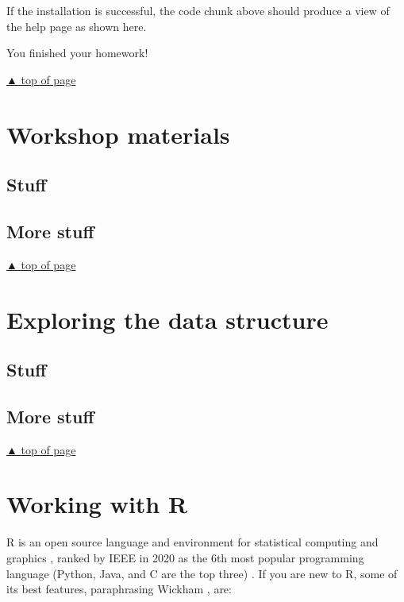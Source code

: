 \documentclass[
]{book}
\begin{document}
If the installation is successful, the code chunk above should produce a view of the help page as shown here.

You finished your homework!

\protect\hyperlink{install-everything}{▲ top of page}

\hypertarget{materials}{%
\chapter{Workshop materials}\label{materials}}

\hypertarget{stuff}{%
\section{Stuff}\label{stuff}}

\hypertarget{more-stuff}{%
\section{More stuff}\label{more-stuff}}

\protect\hyperlink{materials}{▲ top of page}

\hypertarget{stories}{%
\chapter{Exploring the data structure}\label{stories}}

\hypertarget{stuff-1}{%
\section{Stuff}\label{stuff-1}}

\hypertarget{more-stuff-1}{%
\section{More stuff}\label{more-stuff-1}}

\protect\hyperlink{stories}{▲ top of page}

\hypertarget{work-with-R}{%
\chapter{Working with R}\label{work-with-R}}

R is an open source language and environment for statistical computing and graphics \citep{R-base}, ranked by IEEE in 2020 as the 6th most popular programming language (Python, Java, and C are the top three) \citep{Cass:2020}. If you are new to R, some of its best features, paraphrasing Wickham \citeyearpar{wickham2014advanced}, are:
\end{document}
